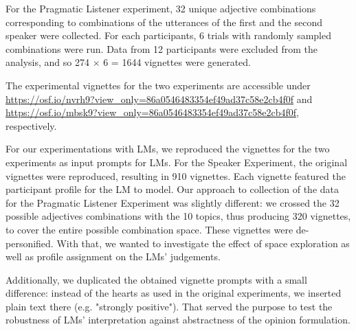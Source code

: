 \documentclass[11pt]{article}
\begin{document}
For the Pragmatic Listener experiment, 32 unique adjective combinations corresponding to combinations of the utterances of the first and the second speaker were collected. For each participants, 6 trials with randomly sampled combinations were run. Data from 12 participants were excluded from the analysis, and so 274 $\times$ 6 = 1644 vignettes were generated.

The experimental vignettes for the two experiments are accessible under \url{https://osf.io/nvrh9?view_only=86a0546483354ef49ad37c58e2cb4f0f} and \url{https://osf.io/mbsk9?view_only=86a0546483354ef49ad37c58e2cb4f0f}, respectively.


For our experimentations with LMs, we reproduced the vignettes for the two experiments as input prompts for LMs. For the Speaker Experiment, the original vignettes were reproduced, resulting in 910 vignettes. Each vignette featured the participant profile for the LM to model. Our approach to collection of the data for the Pragmatic Listener Experiment was slightly different: we crossed the 32 possible adjectives combinations with the 10 topics, thus producing 320 vignettes, to cover the entire possible combination space. These vignettes were de-personified. With that, we wanted to investigate the effect of space exploration as well as profile assignment on the LMs' judgements.

Additionally, we duplicated the obtained vignette prompts with a small difference: instead of the hearts as used in the original experiments, we inserted plain text there (e.g. "strongly positive"). That served the purpose to test the robustness of LMs' interpretation against abstractness of the opinion formulation.


\end{document}
